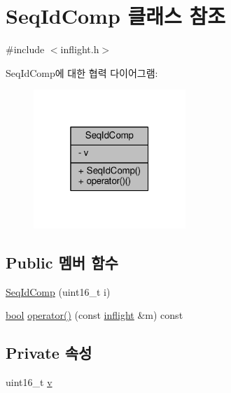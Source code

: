 \hypertarget{classavdecc__lib_1_1_seq_id_comp}{}\section{Seq\+Id\+Comp 클래스 참조}
\label{classavdecc__lib_1_1_seq_id_comp}


{\ttfamily \#include $<$inflight.\+h$>$}



Seq\+Id\+Comp에 대한 협력 다이어그램\+:
\nopagebreak
\begin{figure}[H]
\begin{center}
\leavevmode
\includegraphics[width=163pt]{classavdecc__lib_1_1_seq_id_comp__coll__graph}
\end{center}
\end{figure}
\subsection*{Public 멤버 함수}
\begin{DoxyCompactItemize}
\item 
\hyperlink{classavdecc__lib_1_1_seq_id_comp_a79bd6a59b4319ce45c1460fb34eb8285}{Seq\+Id\+Comp} (uint16\+\_\+t i)
\item 
\hyperlink{avb__gptp_8h_af6a258d8f3ee5206d682d799316314b1}{bool} \hyperlink{classavdecc__lib_1_1_seq_id_comp_ab7556cef0917137b0c40fd91888a7291}{operator()} (const \hyperlink{classavdecc__lib_1_1inflight}{inflight} \&m) const 
\end{DoxyCompactItemize}
\subsection*{Private 속성}
\begin{DoxyCompactItemize}
\item 
uint16\+\_\+t \hyperlink{classavdecc__lib_1_1_seq_id_comp_ac5f38113a34f9eab3e7782eade81d266}{v}
\end{DoxyCompactItemize}


